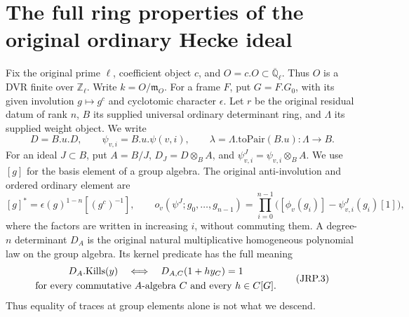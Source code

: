 \section{The full ring properties of the original ordinary Hecke ideal}
\label{sec:ring-properties-v44}


Fix the original prime \(\ell\), coefficient object \(c\), and
\(O=c.O\subset\overline{\mathbb Q}_\ell\).  Thus \(O\) is a DVR
finite over \(\mathbb Z_\ell\).  Write \(k=O/\mathfrak m_O\).
For a frame \(F\), put \(G=F.G_0\), with its given involution
\(g\mapsto g^c\) and cyclotomic character \(\epsilon\).  Let
\(r\) be the original residual datum of rank \(n\),
\(B\) its supplied universal ordinary determinant ring, and
\(\Lambda\) its supplied weight object.  We write
\[
 D=B.u.D,\qquad \psi_{v,i}=B.u.\psi(v,i),\qquad
 \lambda=\Lambda.\mathrm{toPair}(B.u):\Lambda\longrightarrow B.
 \tag{JRP.1}
\]
For an ideal \(J\subset B\), put \(A=B/J\),
\(D_J=D\otimes_B A\), and \(\psi^J_{v,i}=\psi_{v,i}\otimes_B A\).
We use \([g]\) for the basis element of a group algebra.  The original
anti-involution and ordered ordinary element are
\[
 [g]^*=\epsilon(g)^{1-n}[(g^c)^{-1}],\qquad
 o_v(\psi^J;g_0,\ldots,g_{n-1})=
       \prod_{i=0}^{n-1}\bigl([\phi_v(g_i)]-\psi^J_{v,i}(g_i)[1]\bigr),
 \tag{JRP.2}
\]
where the factors are written in increasing \(i\), without commuting
them.  A degree-\(n\) determinant \(D_A\) is the original natural
multiplicative homogeneous polynomial law on the group algebra.
Its kernel predicate has the full meaning
\[
 \begin{gathered}
 D_A.\mathrm{Kills}(y)\quad\Longleftrightarrow\quad
 D_{A,C}(1+h y_C)=1\\
 \hbox{for every commutative \(A\)-algebra \(C\) and every \(h\in C[G]\)}.
 \end{gathered}
 \tag{JRP.3}
\]
Thus equality of traces at group elements alone is not what we descend.


